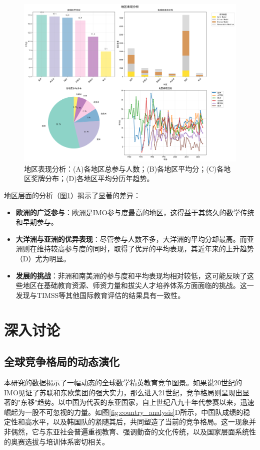 \documentclass[12pt,a4paper]{article}
\begin{document}
\begin{figure}[H]
    \centering
    \includegraphics[width=\textwidth]{regional_analysis.png}
    \caption{地区表现分析：(A)各地区总参与人数；(B)各地区平均分；(C)各地区奖牌分布；(D)各地区平均分历年趋势。}
    \label{fig:regional_analysis}
\end{figure}

地区层面的分析（图\ref{fig:regional_analysis}）揭示了显著的差异：
\begin{itemize}
    \item \textbf{欧洲的广泛参与}：欧洲是IMO参与度最高的地区，这得益于其悠久的数学传统和早期参与。
    \item \textbf{大洋洲与亚洲的优异表现}：尽管参与人数不多，大洋洲的平均分却最高。而亚洲则在维持较高参与度的同时，取得了优异的平均表现，其近年来的上升趋势（D）尤为明显。
    \item \textbf{发展的挑战}：非洲和南美洲的参与度和平均表现均相对较低，这可能反映了这些地区在基础教育资源、师资力量和拔尖人才培养体系方面面临的挑战。这一发现与TIMSS等其他国际教育评估的结果具有一致性\cite{timss_trends}。
\end{itemize}


\section{深入讨论}

\subsection{全球竞争格局的动态演化}

本研究的数据揭示了一幅动态的全球数学精英教育竞争图景。如果说20世纪的IMO见证了苏联和东欧集团的强大实力，那么进入21世纪，竞争格局则呈现出显著的"东移"趋势。以中国为代表的东亚国家，自上世纪八九十年代参赛以来，迅速崛起为一股不可忽视的力量。如图\ref{fig:country_analysis}D所示，中国队成绩的稳定性和高水平，以及韩国队的紧随其后，共同塑造了当前的竞争格局。这一现象并非偶然，它与东亚社会普遍重视教育、强调勤奋的文化传统，以及国家层面系统性的奥赛选拔与培训体系密切相关\cite{asian_mathematics_education,mathematical_olympiad_training}。
\end{document}
